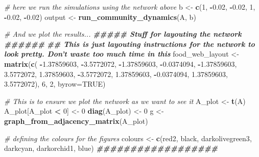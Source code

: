 \documentclass[
]{article}
\newenvironment{Shaded}{\begin{snugshade}}{\end{snugshade}}
\newcommand{\AttributeTok}[1]{\textcolor[rgb]{0.13,0.29,0.53}{#1}}
\newcommand{\CommentTok}[1]{\textcolor[rgb]{0.56,0.35,0.01}{\textit{#1}}}
\newcommand{\ConstantTok}[1]{\textcolor[rgb]{0.56,0.35,0.01}{#1}}
\newcommand{\DecValTok}[1]{\textcolor[rgb]{0.00,0.00,0.81}{#1}}
\newcommand{\DocumentationTok}[1]{\textcolor[rgb]{0.56,0.35,0.01}{\textbf{\textit{#1}}}}
\newcommand{\FloatTok}[1]{\textcolor[rgb]{0.00,0.00,0.81}{#1}}
\newcommand{\FunctionTok}[1]{\textcolor[rgb]{0.13,0.29,0.53}{\textbf{#1}}}
\newcommand{\NormalTok}[1]{#1}
\newcommand{\OtherTok}[1]{\textcolor[rgb]{0.56,0.35,0.01}{#1}}
\newcommand{\SpecialCharTok}[1]{\textcolor[rgb]{0.81,0.36,0.00}{\textbf{#1}}}
\newcommand{\StringTok}[1]{\textcolor[rgb]{0.31,0.60,0.02}{#1}}
\begin{document}
\begin{Shaded}
\begin{Highlighting}[]
\CommentTok{\# here we run the simulations using the network above}
\NormalTok{b }\OtherTok{\textless{}{-}} \FunctionTok{c}\NormalTok{(}\DecValTok{1}\NormalTok{, }\SpecialCharTok{{-}}\FloatTok{0.02}\NormalTok{, }\SpecialCharTok{{-}}\FloatTok{0.02}\NormalTok{, }\DecValTok{1}\NormalTok{, }\SpecialCharTok{{-}}\FloatTok{0.02}\NormalTok{, }\SpecialCharTok{{-}}\FloatTok{0.02}\NormalTok{)}
\NormalTok{output }\OtherTok{\textless{}{-}} \FunctionTok{run\_community\_dynamics}\NormalTok{(A, b)}

\CommentTok{\# And we plot the results...}
\DocumentationTok{\#\#\#\#\# Stuff for layouting the network \#\#\#\#\#\#}
\DocumentationTok{\#\# This is just layouting instructions for the network to look pretty. Don’t waste too much time in this}
\NormalTok{food\_web\_layout }\OtherTok{\textless{}{-}} \FunctionTok{matrix}\NormalTok{(}\FunctionTok{c}\NormalTok{( }\SpecialCharTok{{-}}\FloatTok{1.37859603}\NormalTok{, }\SpecialCharTok{{-}}\FloatTok{3.5772072}\NormalTok{,}
                             \SpecialCharTok{{-}}\FloatTok{1.37859603}\NormalTok{, }\SpecialCharTok{{-}}\FloatTok{0.0374094}\NormalTok{,}
                             \SpecialCharTok{{-}}\FloatTok{1.37859603}\NormalTok{,  }\FloatTok{3.5772072}\NormalTok{,}
                             \FloatTok{1.37859603}\NormalTok{, }\SpecialCharTok{{-}}\FloatTok{3.5772072}\NormalTok{,}
                             \FloatTok{1.37859603}\NormalTok{, }\SpecialCharTok{{-}}\FloatTok{0.0374094}\NormalTok{,}
                             \FloatTok{1.37859603}\NormalTok{,   }\FloatTok{3.5772072}\NormalTok{), }\DecValTok{6}\NormalTok{, }\DecValTok{2}\NormalTok{, }\AttributeTok{byrow=}\ConstantTok{TRUE}\NormalTok{)}

\CommentTok{\# This is to ensure we plot the network as we want to see it}
\NormalTok{A\_plot }\OtherTok{\textless{}{-}} \FunctionTok{t}\NormalTok{(A)}
\NormalTok{A\_plot[A\_plot }\SpecialCharTok{\textless{}} \DecValTok{0}\NormalTok{] }\OtherTok{\textless{}{-}} \DecValTok{0}
\FunctionTok{diag}\NormalTok{(A\_plot) }\OtherTok{\textless{}{-}} \DecValTok{0}
\NormalTok{g }\OtherTok{\textless{}{-}} \FunctionTok{graph\_from\_adjacency\_matrix}\NormalTok{(A\_plot)}

\CommentTok{\# defining the colours for the figures}
\NormalTok{colours }\OtherTok{\textless{}{-}} \FunctionTok{c}\NormalTok{(}\StringTok{\textquotesingle{}red2\textquotesingle{}}\NormalTok{, }\StringTok{\textquotesingle{}black\textquotesingle{}}\NormalTok{, }\StringTok{\textquotesingle{}darkolivegreen3\textquotesingle{}}\NormalTok{, }\StringTok{\textquotesingle{}darkcyan\textquotesingle{}}\NormalTok{, }\StringTok{\textquotesingle{}darkorchid1\textquotesingle{}}\NormalTok{, }\StringTok{\textquotesingle{}blue\textquotesingle{}}\NormalTok{)}
\DocumentationTok{\#\#\#\#\#\#\#\#\#\#\#\#\#\#\#\#\#\#}



\end{Highlighting}
\end{Shaded}
\end{document}
